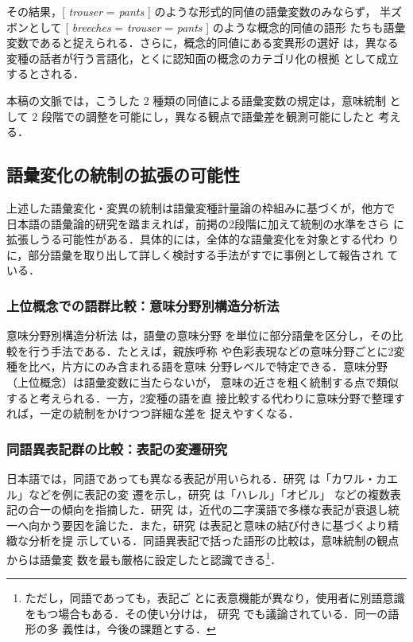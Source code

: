 \documentclass[submit]{ipsj}
\begin{document}
その結果，[ \emph{trouser} = \emph{pants} ] のような形式的同値の語彙変数のみならず，
半ズボンとして [ \emph{breeches} = \emph{trouser} = \emph{pants} ] のような概念的同値の語形
たちも語彙変数であると捉えられる．さらに，概念的同値にある変異形の選好
は，異なる変種の話者が行う言語化，とくに認知面の概念のカテゴリ化の根拠
として成立するとされる\cite{DePascale2019Tokenbased}．

本稿の文脈では，こうした 2 種類の同値による語彙変数の規定は，意味統制
として 2 段階での調整を可能にし，異なる観点で語彙差を観測可能にしたと
考える．
\subsection{語彙変化の統制の拡張の可能性\label{org953a17f}}
\label{sec:org97f4021}
上述した語彙変化・変異の統制は語彙変種計量論の枠組みに基づくが，他方で
日本語の語彙論的研究を踏まえれば，前掲の2段階に加えて統制の水準をさら
に拡張しうる可能性がある．具体的には，全体的な語彙変化を対象とする代わ
りに，部分語彙を取り出して詳しく検討する手法がすでに事例として報告され
ている．
\subsubsection{上位概念での語群比較：意味分野別構造分析法}
\label{sec:orgfa7012a}
意味分野別構造分析法 \cite{tajima2000Goikenkyu} は，語彙の意味分野
を単位に部分語彙を区分し，その比較を行う手法である．たとえば，親族呼称
や色彩表現などの意味分野ごとに2変種を比べ，片方にのみ含まれる語を意味
分野レベルで特定できる．意味分野（上位概念）は語彙変数に当たらないが，
意味の近さを粗く統制する点で類似すると考えられる．一方，2変種の語を直
接比較する代わりに意味分野で整理すれば，一定の統制をかけつつ詳細な差を
捉えやすくなる．
\subsubsection{同語異表記群の比較：表記の変遷研究}
\label{sec:org2d3add8}
日本語では，同語であっても異なる表記が用いられる．研究
\cite{takahashi2019Kindai} は「カワル・カエル」などを例に表記の変
遷を示し，研究 \cite{takahashi2016Kindai} は「ハレル」「オビル」
などの複数表記の合一の傾向を指摘した．研究
\cite{mabuchi2016Kindai} は，近代の二字漢語で多様な表記が衰退し統
一へ向かう要因を論じた．また，研究 \cite{takahashi2016Kindai,takahashi2019Kindai} は表記と意味の結び付きに基づくより精緻な分析を提
示している．同語異表記で括った語形の比較は，意味統制の観点からは語彙変
数を最も厳格に設定したと認識できる\footnote{ただし，同語であっても，表記ご
とに表意機能が異なり，使用者に別語意識をもつ場合もある．その使い分けは，
研究 \cite{takahashi2025Tango} でも議論されている．同一の語形の多
義性は，今後の課題とする．}．
\end{document}
